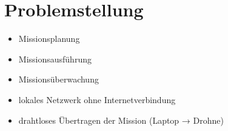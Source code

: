 \section{Problemstellung}

\begin{itemize}
	\item Missionsplanung
	\item Missionsausführung
	\item Missionsüberwachung
\end{itemize}

\begin{itemize}
	\item lokales Netzwerk ohne Internetverbindung
	\item drahtloses Übertragen der Mission (Laptop → Drohne)
\end{itemize}
